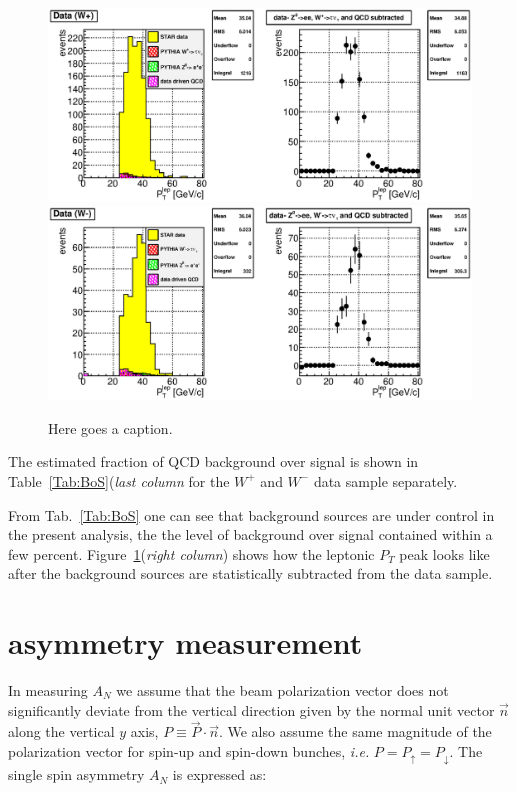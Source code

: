 \documentclass[12pt]{article}
\begin{document}
\begin{figure}[htbp]
\begin{center}
\includegraphics[scale=0.8]{images/backgrounds/plot_5}
\includegraphics[scale=0.8]{images/backgrounds/plot_7}
\end{center}
\caption{Here goes a caption.}
\label{fig:plot_QCD_bkd_pt25} 
\end{figure}

The estimated fraction of QCD background over signal is shown in Table~\ref{Tab:BoS}({\it last column} for the $W^{+}$ and $W^{-}$ data sample separately. 

From Tab.~\ref{Tab:BoS} one can see that background sources are under control in the present analysis, the the level of background over signal contained within a few percent. Figure~\ref{fig:plot_QCD_bkd_pt25}({\it right column}) shows how the leptonic $P_{T}$ peak looks like after the background sources are statistically subtracted from the data sample.

\section{asymmetry measurement}
In measuring $A_{N}$ we assume that the beam polarization vector does not significantly
deviate from the vertical direction given by the normal unit vector $\vec n$
along the vertical $y$ axis, $P \equiv \vec{P} \cdot \vec{n}$. 
We also assume the same magnitude of the polarization vector for
spin-up and spin-down bunches, \textit{i.e.} $P = P_\uparrow = P_\downarrow$.
The single spin asymmetry $A_N$ is expressed as:
\end{document}
